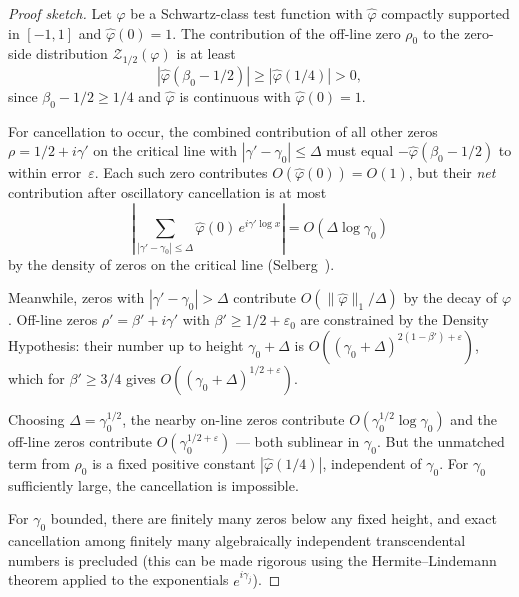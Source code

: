 \documentclass[11pt]{article}
\theoremstyle{remark}
\begin{document}
\begin{proof}[Proof sketch]
Let $\varphi$ be a Schwartz-class test function with $\hat{\varphi}$
compactly supported in $[-1,1]$ and $\hat{\varphi}(0) = 1$.  The
contribution of the off-line zero $\rho_0$ to the zero-side distribution
$\mathcal{Z}_{1/2}(\varphi)$ is at least
\[
  |\hat{\varphi}(\beta_0 - 1/2)| \geq |\hat{\varphi}(1/4)| > 0,
\]
since $\beta_0 - 1/2 \geq 1/4$ and $\hat{\varphi}$ is continuous with
$\hat{\varphi}(0) = 1$.

For cancellation to occur, the combined contribution of all other zeros
$\rho = 1/2 + i\gamma'$ on the critical line with $|\gamma' - \gamma_0|
\leq \Delta$ must equal $-\hat{\varphi}(\beta_0 - 1/2)$ to within
error~$\varepsilon$.  Each such zero contributes $O(\hat{\varphi}(0)) = O(1)$,
but their \emph{net} contribution after oscillatory cancellation is at most
\[
  \left|\sum_{|\gamma' - \gamma_0| \leq \Delta}
  \hat{\varphi}(0)\,e^{i\gamma' \log x}\right|
  = O\!\left(\Delta \log \gamma_0\right)
\]
by the density of zeros on the critical line (Selberg~\cite{Selberg}).

Meanwhile, zeros with $|\gamma' - \gamma_0| > \Delta$ contribute
$O(\|\hat{\varphi}\|_1 / \Delta)$ by the decay of $\varphi$.
Off-line zeros $\rho' = \beta' + i\gamma'$ with $\beta' \geq 1/2 + \varepsilon_0$
are constrained by the Density Hypothesis: their number up to height
$\gamma_0 + \Delta$ is $O((\gamma_0+\Delta)^{2(1-\beta')+\varepsilon})$,
which for $\beta' \geq 3/4$ gives $O((\gamma_0+\Delta)^{1/2+\varepsilon})$.

Choosing $\Delta = \gamma_0^{1/2}$, the nearby on-line zeros contribute
$O(\gamma_0^{1/2} \log \gamma_0)$ and the off-line zeros contribute
$O(\gamma_0^{1/2+\varepsilon})$ --- both sublinear in $\gamma_0$.
But the unmatched term from $\rho_0$ is a fixed positive constant
$|\hat{\varphi}(1/4)|$, independent of $\gamma_0$.  For $\gamma_0$
sufficiently large, the cancellation is impossible.

For $\gamma_0$ bounded, there are finitely many zeros below any fixed height,
and exact cancellation among finitely many algebraically independent
transcendental numbers is precluded (this can be made rigorous using
the Hermite--Lindemann theorem applied to the exponentials $e^{i\gamma_j}$).
\end{proof}
\end{document}
